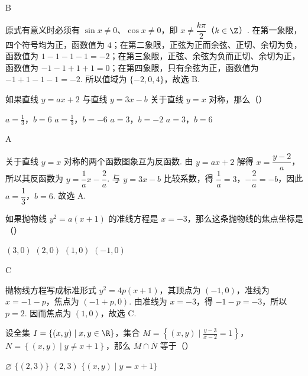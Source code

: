 \documentclass[UTF8,a4paper,oneside,11pt]{ctexbook}
\begin{document}
\begin{answer}B\end{answer}

\begin{solution}
原式有意义时必须有 \(\sin x\ne0\)、\(\cos x\ne0\)，即 \(x\ne\dfrac{k\pi}{2}\)（\(k\in\Z\)）. 在第一象限，四个符号均为正，函数值为 \(4\)；在第二象限，正弦为正而余弦、正切、余切为负，函数值为 \(1-1-1-1=-2\)；在第三象限，正弦、余弦为负而正切、余切为正，函数值为 \(-1-1+1+1=0\)；在第四象限，只有余弦为正，函数值为 \(-1+1-1-1=-2\). 所以值域为 \(\{-2,0,4\}\)，故选 B.
\end{solution}


\begin{problem}
如果直线 \(y=ax+2\) 与直线 \(y=3x-b\) 关于直线 \(y=x\) 对称，那么（\quad）

\choices
    {\(a=\frac{1}{3}\)，\(b=6\)}
    {\(a=\frac{1}{3}\)，\(b=-6\)}
    {\(a=3\)，\(b=-2\)}
    {\(a=3\)，\(b=6\)}
\end{problem}

\begin{answer}A\end{answer}

\begin{solution}
关于直线 \(y=x\) 对称的两个函数图象互为反函数. 由 \(y=ax+2\) 解得 \(x=\dfrac{y-2}{a}\)，所以其反函数为 \(y=\dfrac{1}{a}x-\dfrac{2}{a}\). 与 \(y=3x-b\) 比较系数，得 \(\dfrac1a=3\)，\(-\dfrac2a=-b\)，因此 \(a=\dfrac13\)，\(b=6\). 故选 A.
\end{solution}


\begin{problem}
如果抛物线 \(y^2=a(x+1)\) 的准线方程是 \(x=-3\)，那么这条抛物线的焦点坐标是（\quad）

\choices
    {\((3,0)\)}
    {\((2,0)\)}
    {\((1,0)\)}
    {\((-1,0)\)}
\end{problem}

\begin{answer}C\end{answer}

\begin{solution}
抛物线方程写成标准形式 \(y^2=4p(x+1)\)，其顶点为 \((-1,0)\)，准线为 \(x=-1-p\)，焦点为 \((-1+p,0)\). 由准线为 \(x=-3\)，得 \(-1-p=-3\)，所以 \(p=2\). 因而焦点为 \((1,0)\)，故选 C.
\end{solution}


\begin{problem}
设全集 \(I=\left\{(x,y)\mid x,y\in\R\right\}\)，集合 \(M=\left\{(x,y)\mid \frac{y-3}{x-2}=1\right\}\)，\(N=\left\{(x,y)\mid y\neq x+1\right\}\)，那么 \(\overline{M}\cap \overline{N}\) 等于（\quad）

\choices
    {\(\varnothing\)}
    {\(\{(2,3)\}\)}
    {\((2,3)\)}
    {\(\{(x,y)\mid y=x+1\}\)}
\end{problem}
\end{document}

